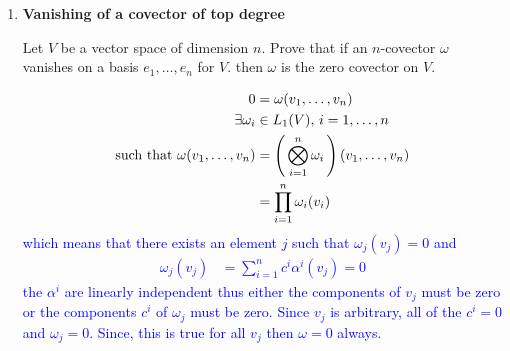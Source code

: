 \documentclass[10pt,a4paper]{report}
\newcommand{\BLUE}[1]{\textcolor{blue}{#1}}
\begin{document}
\begin{enumerate}[label=3.\arabic*.]
\newpage	
	\item \textbf{Vanishing of a covector of top degree}
	
	Let $V$ be a vector space of dimension $n$.  Prove that if an $n$-covector $\omega$ vanishes on a basis $e_1,\dots,e_n$ for $V$.  then $\omega$ is the zero covector on $V$.
	
	\BLUE{\begin{align*}
		0 &= \omega(v_1, \dots, v_n) \\
		\exists \omega_i &\in L_1(V), \, i = 1, \dots, n \\
		\text{such that } \omega(v_1, \dots, v_n) &= \left (\, \bigotimes_{i=1}^n \omega_i \,\right )(v_1, \dots, v_n) \\
		&= \prod_{i=1}^n \omega_i(v_i) \\
	\end{align*}which means that there exists an element $j$ such that $\omega_j(v_j) = 0$ and 
	\begin{align*}
		\omega_j(v_j) &= \sum_{i=1}^n c^i\alpha^i(v_j) = 0
	\end{align*}the $\alpha^i$ are linearly independent thus either the components of $v_j$ must be zero or the components $c^i$ of $\omega_j$ must be zero.  Since $v_j$ is arbitrary, all of the $c^i=0$ and $\omega_j = 0$.  Since, this is true for all $v_j$ then $\omega = 0$ always.
	}

\end{enumerate}
\end{document}
